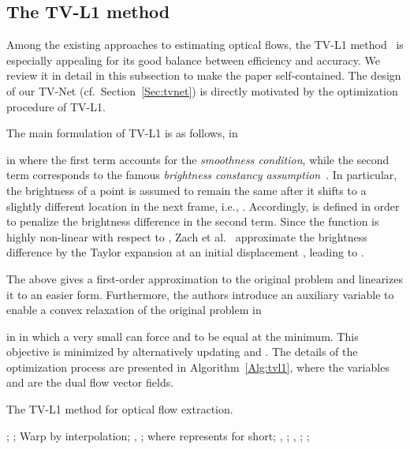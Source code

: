 \documentclass[10pt,twocolumn,letterpaper]{article}
\begin{document}
\subsection{The TV-L1 method}
\label{Sec:tvl1}
Among the existing approaches to estimating  optical flows, the TV-L1 method~\cite{zach2007duality} is especially appealing for its good balance between efficiency and accuracy. We review it in detail in this subsection to make the paper self-contained. The design of our TV-Net (cf.\ Section~\ref{Sec:tvnet}) is directly motivated by the optimization procedure of TV-L1.

The main formulation of TV-L1 is as follows,
 in

 in \noindent
where the first term  accounts for the \emph{smoothness condition}, while the second term  corresponds to the famous \emph{brightness constancy assumption}~\cite{zach2007duality}. In particular, the brightness of a point  is assumed to remain the same after it shifts to a slightly different location in the next frame, i.e., . Accordingly,  is defined in order to penalize the brightness difference in the second term.
Since the function  is highly non-linear with respect to , Zach et al.~\cite{zach2007duality} approximate the brightness difference  by the Taylor expansion at an initial displacement ,  leading to .

The above gives a first-order approximation to the original problem and linearizes it to an easier form. Furthermore, the authors introduce an auxiliary variable  to enable a convex relaxation of the original problem
 in

 in \noindent
in which a very small  can force  and  to be equal at the minimum. This objective is minimized by alternatively updating  and . The details of the optimization process are presented in Algorithm~\ref{Alg:tvl1}, where the variables  and  are the dual flow vector fields.

\begin{algorithm}[t]
\caption{The TV-L1 method for optical flow extraction.}
\label{Alg:tvl1}
\begin{algorithmic}
   \STATE ;
   \STATE ;
   \STATE Warp  by interpolation;
   \STATE , ;
   \STATE  where  represents  for short;
   \STATE , ;
   \STATE , ;
   \STATE ;
   \ENDWHILE
   \ENDFOR
\vskip -0.1in
\end{algorithmic}
\end{algorithm}
\end{document}
